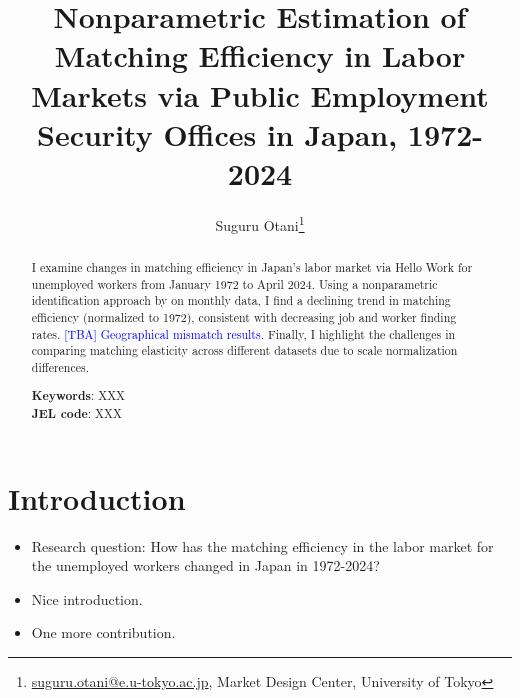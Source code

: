 \documentclass[12pt]{article}
\begin{document}
\title{Nonparametric Estimation of Matching Efficiency in Labor Markets via Public Employment Security Offices in Japan, 1972-2024}
\author{Suguru Otani\thanks{\href{mailto:}{suguru.otani@e.u-tokyo.ac.jp}, Market Design Center, University of Tokyo}}
\maketitle

\begin{abstract}
\noindent
I examine changes in matching efficiency in Japan's labor market via Hello Work for unemployed workers from January 1972 to April 2024. Using a nonparametric identification approach by \cite{lange2020beyond} on monthly data, I find a declining trend in matching efficiency (normalized to 1972), consistent with decreasing job and worker finding rates. \textcolor{blue}{[TBA] Geographical mismatch results.} Finally, I highlight the challenges in comparing matching elasticity across different datasets due to scale normalization differences.

\textbf{Keywords}: XXX \\
\textbf{JEL code}: XXX
\end{abstract}

\section{Introduction}

\begin{itemize}
    \item Research question: How has the matching efficiency in the labor market for the unemployed workers changed in Japan in 1972-2024?
    \item Nice introduction.
    \item One more contribution.
\end{itemize}
\end{document}
